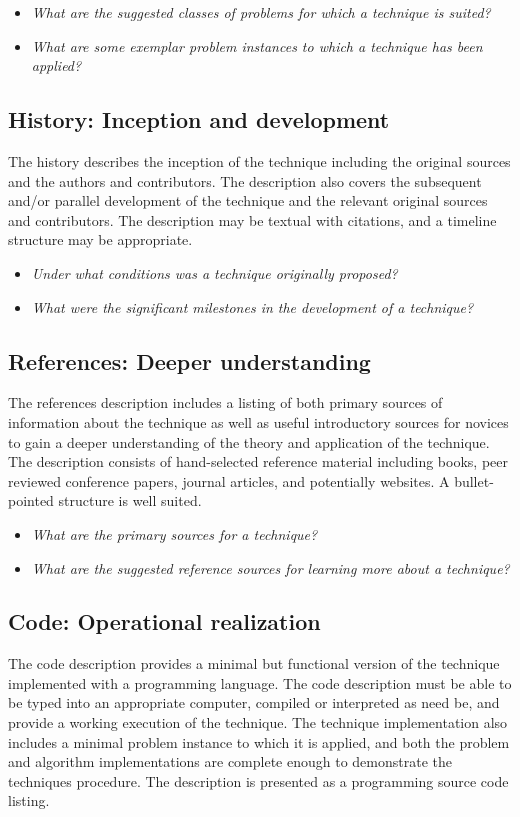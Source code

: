 \documentclass[a4paper, 11pt]{article}
\begin{document}
\begin{itemize}
	\item \emph{What are the suggested classes of problems for which a technique is suited?}
	\item \emph{What are some exemplar problem instances to which a technique has been applied?}
\end{itemize}

\subsection{History: Inception and development}
The history describes the inception of the technique including the original sources and the authors and contributors. The description also covers the subsequent and/or parallel development of the technique and the relevant original sources and contributors. The description may be textual with citations, and a timeline structure may be appropriate.

\begin{itemize}
	\item \emph{Under what conditions was a technique originally proposed?}
	\item \emph{What were the significant milestones in the development of a technique?}
\end{itemize}

\subsection{References: Deeper understanding}
The references description includes a listing of both primary sources of information about the technique as well as useful introductory sources for novices to gain a deeper understanding of the theory and application of the technique. The description consists of hand-selected reference material including books, peer reviewed conference papers, journal articles, and potentially websites. A bullet-pointed structure is well suited. 

\begin{itemize}
	\item \emph{What are the primary sources for a technique?}
	\item \emph{What are the suggested reference sources for learning more about a technique?}
\end{itemize}

\subsection{Code: Operational realization}
The code description provides a minimal but functional version of the technique implemented with a programming language. The code description must be able to be typed into an appropriate computer, compiled or interpreted as need be, and provide a working execution of the technique. The technique implementation also includes a minimal problem instance to which it is applied, and both the problem and algorithm implementations are complete enough to demonstrate the techniques procedure. The description is presented as a programming source code listing.
\end{document}

